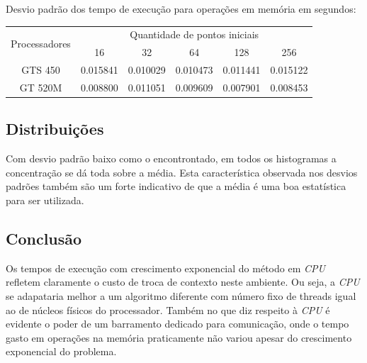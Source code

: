     \hspace{1mm}\newline
    
    \noindent Desvio padrão dos tempo de execução para operações em memória em segundos:\\
    \begin{tabular}{| c | c | c | c | c | c |}
      \hline
      \multirow{2}{*}{Processadores}& \multicolumn{5}{|c|}{Quantidade de pontos iniciais} \\ \cline{2-6}
      & 16 & 32 & 64 & 128 & 256 \\ \hline
      GTS 450 & 0.015841 & 0.010029 & 0.010473 & 0.011441 & 0.015122 \\ \hline
      GT 520M & 0.008800 & 0.011051 & 0.009609 & 0.007901 & 0.008453 \\ \hline

      \hline
    \end{tabular}
    
  \subsection{Distribuições}
    Com desvio padrão baixo como o encontrontado, em todos os histogramas a concentração se dá toda sobre a média. Esta característica observada nos desvios padrões também são um forte indicativo de que a média é uma boa estatística para ser utilizada.    
  
  \subsection{Conclusão}
  Os tempos de execução com crescimento exponencial do método em \textit{CPU} refletem claramente o custo de troca de contexto neste ambiente. Ou seja, a \textit{CPU} se adapataria melhor a um algoritmo diferente com número fixo de threads igual ao de núcleos físicos do processador. Também no que diz respeito à \textit{CPU} é evidente o poder de um barramento dedicado para comunicação, onde o tempo gasto em operações na memória praticamente não variou apesar do crescimento exponencial do problema.
  

